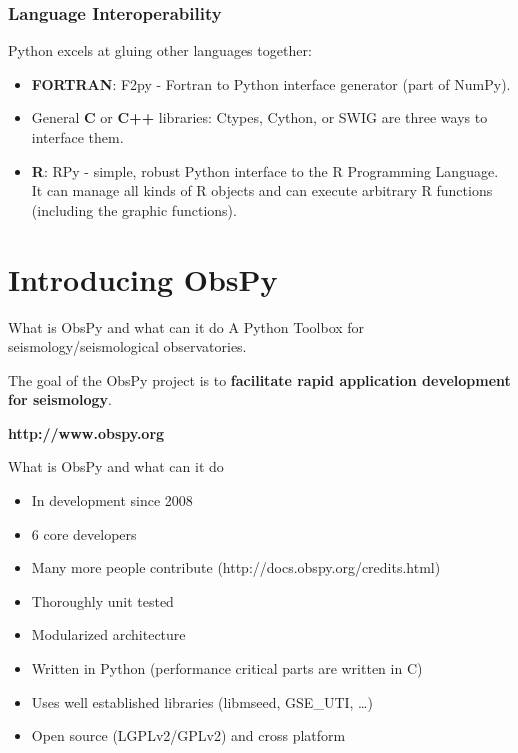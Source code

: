 \documentclass[handout]{beamer}
\begin{document}
\begin{frame}
    \frametitle{Language Interoperability}
    Python excels at gluing other languages together: 
     \begin{itemize}
       \item \textbf{FORTRAN}: F2py - Fortran to Python interface generator (part of NumPy).
       \pause
       \item General \textbf{C} or \textbf{C++} libraries: Ctypes, Cython, or SWIG are three ways to interface them.
       \pause
       \item \textbf{R}: RPy - simple, robust Python interface to the R Programming Language. It can manage all kinds of R objects and can execute arbitrary R functions (including the graphic functions).
    \end{itemize}
\end{frame}


\section{Introducing ObsPy}
\frame[plain]{\tableofcontents[currentsection]}

\begin{frame}[plain]{What is ObsPy and what can it do}
    A Python Toolbox for seismology/seismological observatories. 

    \vspace{2em}

    The goal of the ObsPy project is to \textbf{facilitate rapid application development for seismology}. 

    \vspace{3em}

    \large
    \begin{center}
        \textbf{http://www.obspy.org}
    \end{center}
\end{frame}


\begin{frame}{What is ObsPy and what can it do}
    \begin{itemize}
        \item In development since 2008
        \item 6 core developers
        \item Many more people contribute (http://docs.obspy.org/credits.html)
        \item Thoroughly unit tested
        \item Modularized architecture
        \item Written in Python (performance critical parts are written in C)
        \item Uses well established libraries (libmseed, GSE\_UTI, \dots)
        \item Open source (LGPLv2/GPLv2) and cross platform
    \end{itemize}
\end{frame}
\end{document}
